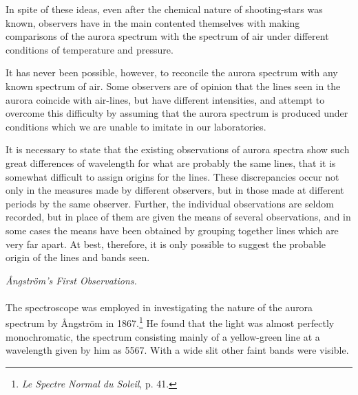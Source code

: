 \documentclass[a4paper, 12pt, oneside, polutonikogreek, english]{article}
\begin{document}
In spite of these ideas, even after the chemical nature of shooting-stars was known, observers have in the main contented themselves with making comparisons of the aurora spectrum with the spectrum of air under different conditions of temperature and pressure.

It has never been possible, however, to reconcile the aurora spectrum with any known spectrum of air. Some observers are of opinion that the lines seen in the aurora coincide with air-lines, but have different intensities, and attempt to overcome this difficulty by assuming that the aurora spectrum is produced under conditions which we are unable to imitate in our laboratories.

It is necessary to state that the existing observations of aurora spectra show such great differences of wavelength for what are probably the same lines, that it is somewhat difficult to assign origins for the lines. These discrepancies occur not only in the measures made by different observers, but in those made at different periods by the same observer. Further, the individual observations are seldom recorded, but in place of them are given the means of several observations, and in some cases the means have been obtained by grouping together lines which are very far apart. At best, therefore, it is only possible to suggest the probable origin of the lines and bands seen.
\begin{center}
\emph{Ångström's First Observations.} 
\end{center}
\paragraph{}
The spectroscope was employed in investigating the nature of the aurora spectrum by Ångström in 1867.\footnote{\emph{Le Spectre Normal du Soleil}, p. 41.} He found that the light was almost perfectly monochromatic, the spectrum consisting mainly of a yellow-green line at a wavelength given by him as 5567. With a wide slit other faint bands were visible.
\end{document}

